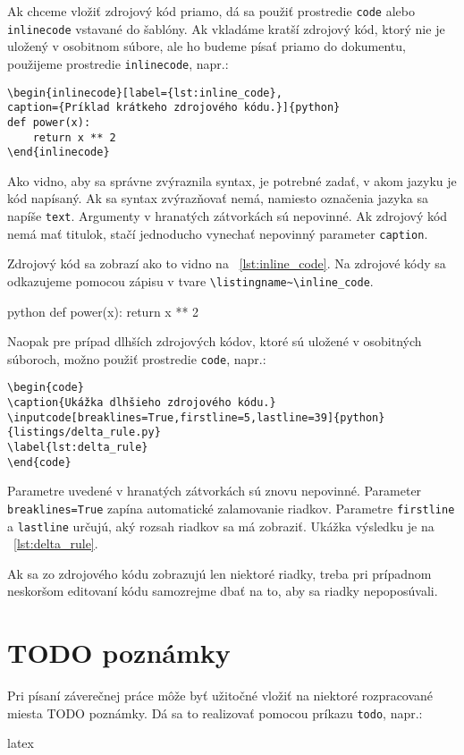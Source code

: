 Ak chceme vložiť zdrojový kód priamo, dá sa použiť prostredie \texttt{code} alebo \texttt{inlinecode} vstavané do šablóny. Ak vkladáme kratší zdrojový kód, ktorý nie je uložený v osobitnom súbore, ale ho budeme písať priamo do dokumentu, použijeme prostredie \texttt{inlinecode}, napr.:
\begin{Verbatim}
\begin{inlinecode}[label={lst:inline_code},
caption={Príklad krátkeho zdrojového kódu.}]{python}
def power(x):
	return x ** 2
\end{inlinecode}
\end{Verbatim}
Ako vidno, aby sa správne zvýraznila syntax, je potrebné zadať, v akom jazyku je kód napísaný. Ak sa syntax zvýrazňovať nemá, namiesto označenia jazyka sa napíše \texttt{text}. Argumenty v hranatých zátvorkách sú nepovinné. Ak zdrojový kód nemá mať titulok, stačí jednoducho vynechať nepovinný parameter \texttt{caption}.

Zdrojový kód sa zobrazí ako to vidno na \listingname~\ref{lst:inline_code}. Na zdrojové kódy sa odkazujeme pomocou zápisu v tvare \texttt{{\textbackslash}listingname\textasciitilde{\textbackslash}inline\_code}.

\begin{inlinecode}[label={lst:inline_code},
caption={Príklad krátkeho zdrojového kódu.}]{python}
def power(x):
	return x ** 2
\end{inlinecode}
Naopak pre prípad dlhších zdrojových kódov, ktoré sú uložené v osobitných súboroch, možno použiť prostredie \texttt{code}, napr.:
\begin{Verbatim}
\begin{code}
\caption{Ukážka dlhšieho zdrojového kódu.}
\inputcode[breaklines=True,firstline=5,lastline=39]{python}{listings/delta_rule.py}
\label{lst:delta_rule}
\end{code}
\end{Verbatim}

Parametre uvedené v hranatých zátvorkách sú znovu nepovinné. Parameter \texttt{breaklines=True} zapína automatické zalamovanie riadkov. Parametre \texttt{firstline} a \texttt{lastline} určujú, aký rozsah riadkov sa má zobraziť. Ukážka výsledku je na \listingname~\ref{lst:delta_rule}.
\begin{code}
\caption{Ukážka dlhšieho zdrojového kódu.}
\label{lst:delta_rule}
\end{code}
Ak sa zo zdrojového kódu zobrazujú len niektoré riadky, treba pri prípadnom neskoršom editovaní kódu samozrejme dbať na to, aby sa riadky nepoposúvali.

\section{TODO poznámky}

Pri písaní záverečnej práce môže byť užitočné vložiť na niektoré rozpracované miesta TODO poznámky. Dá sa to realizovať pomocou príkazu \texttt{todo}, napr.:
\begin{inlinecode}{latex}
\end{inlinecode}

